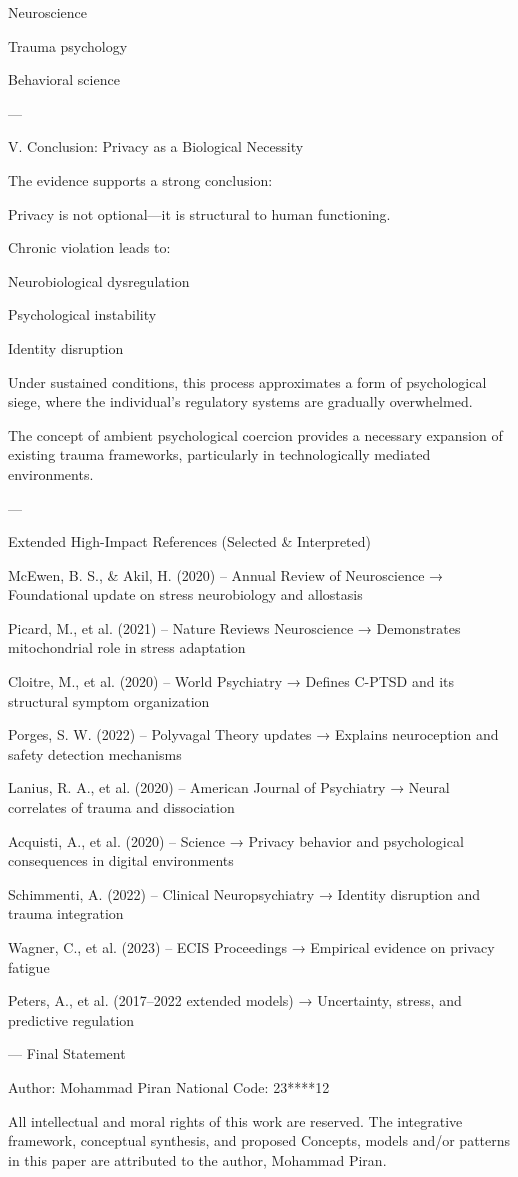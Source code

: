 Neuroscience

Trauma psychology

Behavioral science



---

V. Conclusion: Privacy as a Biological Necessity

The evidence supports a strong conclusion:

Privacy is not optional—it is structural to human functioning.

Chronic violation leads to:

Neurobiological dysregulation

Psychological instability

Identity disruption


Under sustained conditions, this process approximates a form of psychological siege, where the individual’s regulatory systems are gradually overwhelmed.

The concept of ambient psychological coercion provides a necessary expansion of existing trauma frameworks, particularly in technologically mediated environments.


---

Extended High-Impact References (Selected & Interpreted)

McEwen, B. S., & Akil, H. (2020) – Annual Review of Neuroscience
→ Foundational update on stress neurobiology and allostasis

Picard, M., et al. (2021) – Nature Reviews Neuroscience
→ Demonstrates mitochondrial role in stress adaptation

Cloitre, M., et al. (2020) – World Psychiatry
→ Defines C-PTSD and its structural symptom organization

Porges, S. W. (2022) – Polyvagal Theory updates
→ Explains neuroception and safety detection mechanisms

Lanius, R. A., et al. (2020) – American Journal of Psychiatry
→ Neural correlates of trauma and dissociation

Acquisti, A., et al. (2020) – Science
→ Privacy behavior and psychological consequences in digital environments

Schimmenti, A. (2022) – Clinical Neuropsychiatry
→ Identity disruption and trauma integration

Wagner, C., et al. (2023) – ECIS Proceedings
→ Empirical evidence on privacy fatigue

Peters, A., et al. (2017–2022 extended models)
→ Uncertainty, stress, and predictive regulation

---
Final Statement

Author: Mohammad Piran
National Code: 23****12

All intellectual and moral rights of this work are reserved. The integrative framework, conceptual synthesis, and proposed Concepts, models and/or patterns in this paper are attributed to the author, Mohammad Piran.
